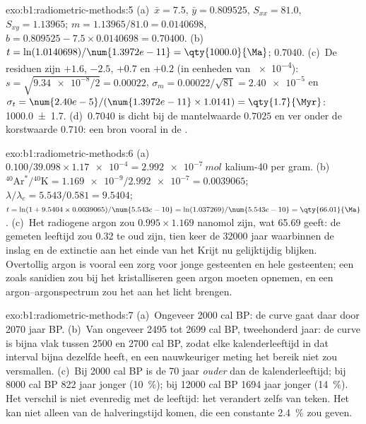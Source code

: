 \begin{solution}{exo:b1:radiometric-methods:5}
(a)~$\bar x = 7.5$, $\bar y = 0.809525$, $S_{xx} = 81.0$, $S_{xy} = 1.13965$;
$m = 1.13965/81.0 = 0.0140698$, $b = 0.809525 - 7.5 \times 0.0140698 = 0.70400$.
(b)~$t = \ln(1.0140698)/\num{1.3972e-11} = \qty{1000.0}{\Ma}$; 
$0.7040$. (c)~De residuen zijn $+1.6$, $-2.5$, $+0.7$ en $+0.2$ (in eenheden van
\num{e-4}): $s = \sqrt{\num{9.34e-8}/2} = 0.00022$, $\sigma_m = 0.00022/\sqrt{81}
= \num{2.40e-5}$ en $\sigma_t = \num{2.40e-5}/(\num{1.3972e-11} \times 1.0141) =
\qty{1.7}{\Myr}$: \qty[uncertainty-mode=separate]{1000.0(17)}{\Ma}. (d)~$0.7040$
is dicht bij de mantelwaarde $0.7025$ en ver onder de korstwaarde $0.710$: een bron
vooral in de .
\end{solution}

\begin{solution}{exo:b1:radiometric-methods:6}
(a)~$0.100/39.098 \times \num{1.17e-4} = \qty{2.992e-7}{mol}$ kalium-40 per
gram. (b)~${}^{40}\mathrm{Ar}^*/{}^{40}\mathrm{K} = \num{1.169e-9}/\num{2.992e-7}
= 0.0039065$; $\lambda/\lambda_e = 5.543/0.581 = 9.5404$; $t = \ln(1 + 9.5404
\times 0.0039065)/\num{5.543e-10} = \ln(1.037269)/\num{5.543e-10} =
\qty{66.01}{\Ma}$. (c)~Het radiogene argon zou $0.995 \times 1.169$
nanomol zijn, wat \qty{65.69}{\Ma} geeft: de gemeten leeftijd zou \qty{0.32}{\Myr}
te oud zijn, tien keer de \num{32000} jaar waarbinnen de inslag en de
extinctie aan het einde van het Krijt nu gelijktijdig blijken. Overtollig argon is vooral een zorg voor jonge gesteenten en hele gesteenten; een
 zoals sanidien zou bij het kristalliseren geen argon moeten opnemen, en een
argon--argonspectrum zou het aan het licht brengen.
\end{solution}

\begin{solution}{exo:b1:radiometric-methods:7}
(a)~Ongeveer \num{2000} cal BP: de curve gaat daar door \num{2070} jaar BP.
(b)~Van ongeveer \num{2495} tot \num{2699} cal BP, tweehonderd jaar: de curve is
bijna vlak tussen \num{2500} en \num{2700} cal BP, zodat elke kalenderleeftijd in dat
interval bijna dezelfde  heeft, en een nauwkeuriger meting het
bereik niet zou versmallen. (c)~Bij \num{2000} cal BP is de 
\num{70} jaar \emph{ouder} dan de kalenderleeftijd; bij \num{8000} cal BP
\num{822} jaar jonger (\qty{10}{\percent}); bij \num{12000} cal BP \num{1694} jaar jonger (\qty{14}{\percent}). Het verschil is niet evenredig met de leeftijd: het verandert zelfs van teken. Het kan niet alleen van de halveringstijd komen, die een constante \qty{2.4}{\percent} zou geven.
\end{solution}

